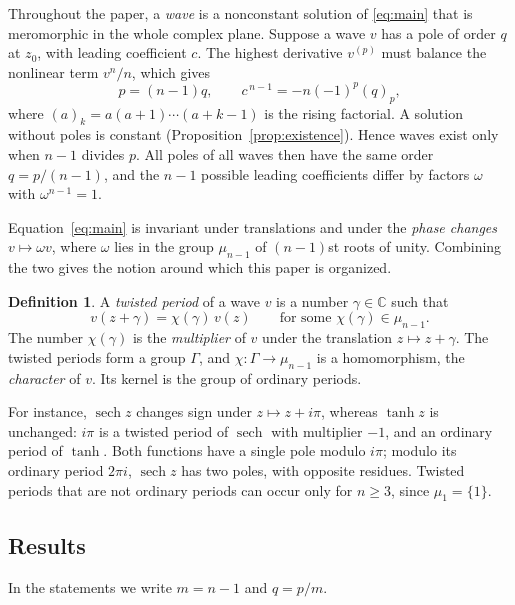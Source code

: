 \documentclass[11pt]{article}
\theoremstyle{definition}
\newtheorem{definition}[theorem]{Definition}
\theoremstyle{remark}
\numberwithin{equation}{section}
\newcommand{\CC}{\mathbb C}
\DeclareMathOperator{\sech}{sech}
\begin{document}
Throughout the paper, a \emph{wave} is a nonconstant solution of
\eqref{eq:main} that is meromorphic in the whole complex plane.
Suppose a wave \(v\) has a pole of order \(q\) at \(z_0\), with leading
coefficient \(c\). The highest derivative \(v^{(p)}\) must balance the
nonlinear term \(v^n/n\), which gives
\begin{equation}\label{eq:balance}
 p=(n-1)q,\qquad c^{\,n-1}=-n(-1)^p(q)_p,
\end{equation}
where \((a)_k=a(a+1)\cdots(a+k-1)\) is the rising factorial. A solution
without poles is constant (Proposition~\ref{prop:existence}). Hence
waves exist only when \(n-1\) divides \(p\). All poles of all waves
then have the same order \(q=p/(n-1)\), and the \(n-1\) possible leading
coefficients differ by factors \(\omega\) with \(\omega^{n-1}=1\).

Equation~\eqref{eq:main} is invariant under translations and under the
\emph{phase changes} \(v\mapsto\omega v\), where \(\omega\) lies in the
group \(\mu_{n-1}\) of \((n-1)\)st roots of unity. Combining the two
gives the notion around which this paper is organized.

\begin{definition}\label{def:twisted}
A \emph{twisted period} of a wave \(v\) is a number \(\gamma\in\CC\)
such that
\[
 v(z+\gamma)=\chi(\gamma)\,v(z)\qquad\text{for some }
 \chi(\gamma)\in\mu_{n-1}.
\]
The number \(\chi(\gamma)\) is the \emph{multiplier} of \(v\) under the
translation \(z\mapsto z+\gamma\). The twisted periods form a group
\(\Gamma\), and \(\chi\colon\Gamma\to\mu_{n-1}\) is a homomorphism, the
\emph{character} of \(v\). Its kernel is the group of ordinary periods.
\end{definition}

For instance, \(\sech z\) changes sign under \(z\mapsto z+i\pi\),
whereas \(\tanh z\) is unchanged: \(i\pi\) is a twisted period of
\(\sech\) with multiplier \(-1\), and an ordinary period of \(\tanh\).
Both functions have a single pole modulo \(i\pi\); modulo its ordinary
period \(2\pi i\), \(\sech z\) has two poles, with opposite residues.
Twisted periods that are not ordinary periods can occur only for
\(n\ge3\), since \(\mu_1=\{1\}\).

\subsection{Results}

In the statements we write \(m=n-1\) and \(q=p/m\).
\end{document}
